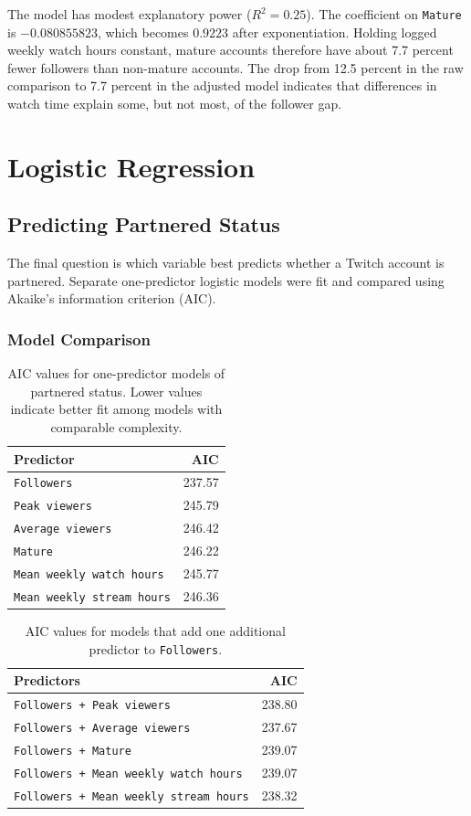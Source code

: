 \documentclass[11pt]{article}
\begin{document}
The model has modest explanatory power ($R^2 = 0.25$). The coefficient on \texttt{Mature} is $-0.080855823$, which becomes $0.9223$ after exponentiation. Holding logged weekly watch hours constant, mature accounts therefore have about 7.7 percent fewer followers than non-mature accounts. The drop from 12.5 percent in the raw comparison to 7.7 percent in the adjusted model indicates that differences in watch time explain some, but not most, of the follower gap.

\section{Logistic Regression}

\subsection{Predicting Partnered Status}
The final question is which variable best predicts whether a Twitch account is partnered. Separate one-predictor logistic models were fit and compared using Akaike's information criterion (AIC).

\subsubsection{Model Comparison}
\begin{table}[H]
\centering
\caption{AIC values for one-predictor models of partnered status. Lower values indicate better fit among models with comparable complexity.}
\label{tab:aic_single}
\begin{tabular}{@{}lr@{}}
\toprule
Predictor & AIC \\
\midrule
\texttt{Followers} & 237.57 \\
\texttt{Peak viewers} & 245.79 \\
\texttt{Average viewers} & 246.42 \\
\texttt{Mature} & 246.22 \\
\texttt{Mean weekly watch hours} & 245.77 \\
\texttt{Mean weekly stream hours} & 246.36 \\
\bottomrule
\end{tabular}
\end{table}

\begin{table}[H]
\centering
\caption{AIC values for models that add one additional predictor to \texttt{Followers}.}
\label{tab:aic_multi}
\begin{tabular}{@{}lr@{}}
\toprule
Predictors & AIC \\
\midrule
\texttt{Followers + Peak viewers} & 238.80 \\
\texttt{Followers + Average viewers} & 237.67 \\
\texttt{Followers + Mature} & 239.07 \\
\texttt{Followers + Mean weekly watch hours} & 239.07 \\
\texttt{Followers + Mean weekly stream hours} & 238.32 \\
\bottomrule
\end{tabular}
\end{table}
\end{document}
